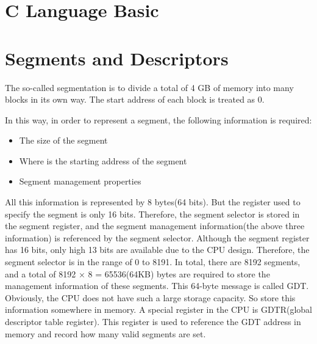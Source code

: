 \documentclass{swfcthesis}
\begin{document}






\section{C Language Basic}

\section{Segments and Descriptors}
The so-called segmentation is to divide a total of 4 GB of memory into many blocks in its
own way. The start address of each block is treated as 0.

In this way, in order to represent a segment, the following information is required:
\begin{itemize}
\item The size of the segment
\item Where is the starting address of the segment
\item Segment management properties
\end{itemize}

All this information is represented by 8 bytes(64 bits). But the register used to specify
the segment is only 16 bits. Therefore, the segment selector is stored in the segment
register, and the segment management information(the above three information) is
referenced by the segment selector. Although the segment register has 16 bits, only high 13
bits are available due to the CPU design. Therefore, the segment selector is in the range
of 0 to 8191. In total, there are 8192 segments, and a total of 8192 × 8 = 65536(64KB) bytes are
required to store the management information of these segments. This 64-byte message is
called GDT. Obviously, the CPU does not have such a large storage capacity. So store this
information somewhere in memory. A special register in the CPU is GDTR(global descriptor
table register). This register is used to reference the GDT address in memory and record
how many valid segments are set.
\end{document}
